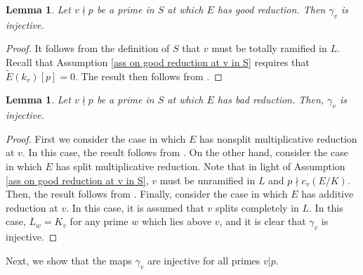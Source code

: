 \documentclass[12pt]{amsart}
\newtheorem{lemma}[theorem]{Lemma}
\numberwithin{equation}{section}
\begin{document}
\begin{lemma}\label{gamma_v injective for v nmid p good}
    Let $v\nmid p$ be a prime in $S$ at which $E$ has good reduction. Then $\gamma_v$ is injective.
\end{lemma}

\begin{proof}
    It follows from the definition of $S$ that $v$ must be totally ramified in $L$. Recall that Assumption \ref{ass on good reduction at v in S} requires that $\widetilde{E}(k_v)[p]=0$. The result then follows from \cite[Proposition 2.8]{pathak2024rank}.
\end{proof}

\begin{lemma}\label{gamma_v injective for v nmid p bad}
    Let $v\nmid p$ be a prime in $S$ at which $E$ has bad reduction. Then, $\gamma_v$ is injective. 
\end{lemma}
\begin{proof}
    \par First we consider the case in which $E$ has nonsplit multiplicative reduction at $v$. In this case, the result follows from \cite[Proposition 5.8]{brau2014selmer}. On the other hand, consider the case in which $E$ has split multiplicative reduction. Note that in light of Assumption \ref{ass on good reduction at v in S}, $v$ must be unramified in $L$ and $p\nmid c_v(E/K)$. Then, the result follows from \cite[Proposition 5.7, (ii)]{brau2014selmer}. Finally, consider the case in which $E$ has additive reduction at $v$. In this case, it is assumed that $v$ splits completely in $L$. In this case, $L_w=K_v$ for any prime $w$ which lies above $v$, and it is clear that $\gamma_v$ is injective.
\end{proof}

Next, we show that the maps $\gamma_v$ are injective for all primes $v|p$.  
\end{document}
